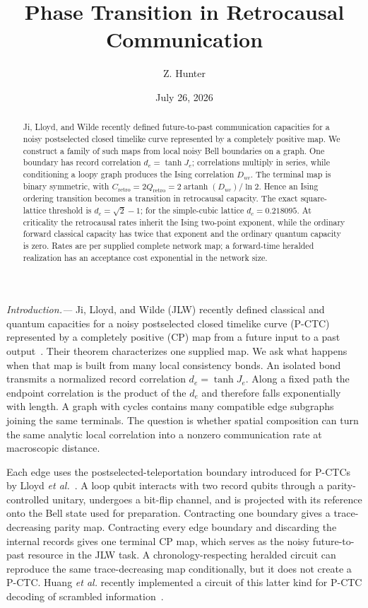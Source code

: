 \documentclass[aps,prl,reprint,amsmath,amssymb,superscriptaddress,nofootinbib,floatfix]{revtex4-2}
\newcommand{\Cretro}{C_{\mathrm{retro}}}
\newcommand{\Qretro}{Q_{\mathrm{retro}}}
\begin{document}
\title{Phase Transition in Retrocausal Communication}
\author{Z. Hunter}
\date{July 26, 2026}
\begin{abstract}
Ji, Lloyd, and Wilde recently defined future-to-past communication capacities for a noisy postselected closed timelike curve represented by a completely positive map. We construct a family of such maps from local noisy Bell boundaries on a graph. One boundary has record correlation $d_e=\tanh J_e$; correlations multiply in series, while conditioning a loopy graph produces the Ising correlation $D_{uv}$. The terminal map is binary symmetric, with $\Cretro=2\Qretro=2\operatorname{artanh}(D_{uv})/\ln2$. Hence an Ising ordering transition becomes a transition in retrocausal capacity. The exact square-lattice threshold is $d_c=\sqrt2-1$; for the simple-cubic lattice $d_c=0.218095$. At criticality the retrocausal rates inherit the Ising two-point exponent, while the ordinary forward classical capacity has twice that exponent and the ordinary quantum capacity is zero. Rates are per supplied complete network map; a forward-time heralded realization has an acceptance cost exponential in the network size.
\end{abstract}
\maketitle
\textit{Introduction.---}
Ji, Lloyd, and Wilde (JLW) recently defined classical and quantum capacities for a noisy postselected closed timelike curve (P-CTC) represented by a completely positive (CP) map from a future input to a past output~\cite{Ji2026}. Their theorem characterizes one supplied map. We ask what happens when that map is built from many local consistency bonds. An isolated bond transmits a normalized record correlation $d_e=\tanh J_e$. Along a fixed path the endpoint correlation is the product of the $d_e$ and therefore falls exponentially with length. A graph with cycles contains many compatible edge subgraphs joining the same terminals. The question is whether spatial composition can turn the same analytic local correlation into a nonzero communication rate at macroscopic distance.

Each edge uses the postselected-teleportation boundary introduced for P-CTCs by Lloyd \textit{et al.}~\cite{Lloyd2011}. A loop qubit interacts with two record qubits through a parity-controlled unitary, undergoes a bit-flip channel, and is projected with its reference onto the Bell state used for preparation. Contracting one boundary gives a trace-decreasing parity map. Contracting every edge boundary and discarding the internal records gives one terminal CP map, which serves as the noisy future-to-past resource in the JLW task. A chronology-respecting heralded circuit can reproduce the same trace-decreasing map conditionally, but it does not create a P-CTC. Huang \textit{et al.} recently implemented a circuit of this latter kind for P-CTC decoding of scrambled information~\cite{Huang2026}.
\end{document}
